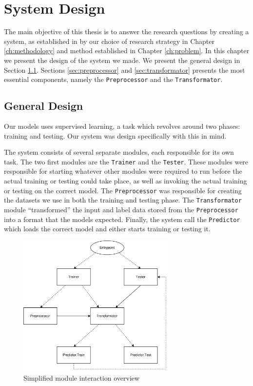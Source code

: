 
\chapter{System Design}
\label{ch:system_design}
The main objective of this thesis is to answer the research questions by creating a system, as established in by our choice of research strategy in Chapter \ref{ch:methodology} and method established in Chapter \ref{ch:problem}. In this chapter we present the design of the system we made. We present the general design in Section \ref{sec:general_design}. Sections \ref{sec:preprocessor} and \ref{sec:transformator} presents the most essential components, namely the {\tt Preprocessor} and the {\tt Transformator}.


\section{General Design}
\label{sec:general_design}
Our models uses supervised learning, a task which revolves around two phases: training and testing. Our system was design specifically with this in mind.

The system consists of several separate modules, each responsible for its own task. The two first modules are the {\tt Trainer} and the {\tt Tester}. These modules were responsible for starting whatever other modules were required to run before the actual training or testing could take place, as well as invoking the actual training or testing on the correct model. The {\tt Preprocessor} was responsible for creating the datasets we use in both the training and testing phase. The {\tt Transformator} module ``transformed'' the input and label data stored from the {\tt Preprocessor} into a format that the models expected. Finally, the system call the {\tt Predictor} which loads the correct model and either starts training or testing it.

\begin{figure}[ht]
    \centering
    \includegraphics[width=0.7\textwidth]{fig/system_design/system_design.png}
    \caption{Simplified module interaction overview}
    \label{fig:system-design}
\end{figure}

